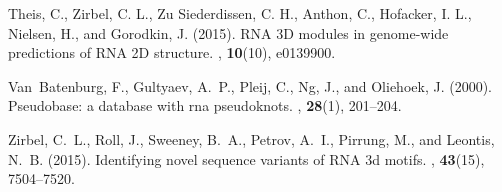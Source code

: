 \documentclass{bioinfo}
\begin{document}
\begin{thebibliography}{25}
   Theis, C., Zirbel, C. L., Zu Siederdissen, C. H., Anthon, C., Hofacker, I. L., Nielsen, H., and Gorodkin, J. (2015). 
   \newblock RNA 3D modules in genome-wide predictions of RNA 2D structure. 
   , {\bf 10}(10), e0139900.

   Van~Batenburg, F., Gultyaev, A.~P., Pleij, C., Ng, J., and Oliehoek, J. (2000).
   \newblock Pseudobase: a database with rna pseudoknots.
   , {\bf 28}(1), 201--204.
   
   Zirbel, C.~L., Roll, J., Sweeney, B.~A., Petrov, A.~I., Pirrung, M., and
     Leontis, N.~B. (2015).
   \newblock Identifying novel sequence variants of {RNA} 3d motifs.
   , {\bf 43}(15), 7504--7520.
   
   \end{thebibliography}
   
\end{document}
